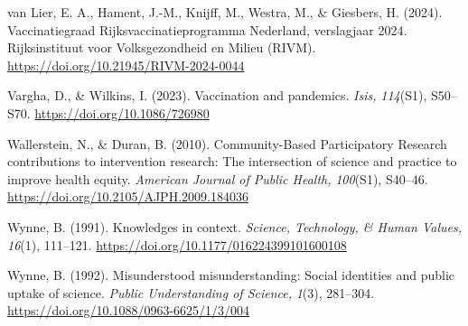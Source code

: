 \documentclass[authordate, reflection]{jote-new-article}
\begin{document}
	van Lier, E. A., Hament, J.-M., Knijff, M., Westra, M., \& Giesbers, H. (2024). Vaccinatiegraad Rijksvaccinatieprogramma Nederland, verslagjaar 2024. Rijksinstituut voor Volksgezondheid en Milieu (RIVM). \url{https://doi.org/10.21945/RIVM-2024-0044}



	Vargha, D., \& Wilkins, I. (2023). Vaccination and pandemics. \emph{Isis,} \emph{114}(S1), S50--S70. \url{https://doi.org/10.1086/726980}



	Wallerstein, N., \& Duran, B. (2010). Community-Based Participatory Research contributions to intervention research: The intersection of science and practice to improve health equity. \emph{American Journal of Public Health,} \emph{100}(S1), S40--46. \url{https://doi.org/10.2105/AJPH.2009.184036}



	Wynne, B. (1991). Knowledges in context. \emph{Science, Technology, \& Human Values,} \emph{16}(1), 111--121. \url{https://doi.org/10.1177/016224399101600108}



	Wynne, B. (1992). Misunderstood misunderstanding: Social identities and public uptake of science. \emph{Public Understanding of Science,} \emph{1}(3), 281--304. \url{https://doi.org/10.1088/0963-6625/1/3/004}
\end{document}
